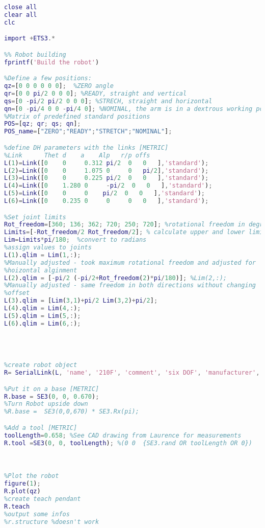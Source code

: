 \begin{lstlisting}[language=Matlab]
%% init
close all
clear all
clc

import +ETS3.* 

%% Robot building
fprintf('Build the robot')

%Define a few positions:
qz=[0 0 0 0 0 0];  %ZERO angle
qr=[0 0 pi/2 0 0 0]; %READY, straight and vertical
qs=[0 -pi/2 pi/2 0 0 0]; %STRECH, straight and horizontal
qn=[0 -pi/4 0 0 -pi/4 0]; %NOMINAL, the arm is in a dextrous working pose
%Matrix of predefined standard positions
POS=[qz; qr; qs; qn];
POS_name=["ZERO";"READY";"STRETCH";"NOMINAL"];

%define DH parameters with the links [METRIC]
%Link      Thet d    a    Alp   r/p offs
L(1)=Link([0    0     0.312 pi/2  0   0   ],'standard');
L(2)=Link([0    0     1.075 0     0   pi/2],'standard'); 
L(3)=Link([0    0     0.225 pi/2  0   0   ],'standard');
L(4)=Link([0    1.280 0     -pi/2  0   0   ],'standard');
L(5)=Link([0    0     0    pi/2  0   0   ],'standard'); 
L(6)=Link([0    0.235 0     0     0   0   ],'standard');

%Set joint limits
Rot_freedom=[360; 136; 362; 720; 250; 720]; %rotational freedom in degrees
Limits=[-Rot_freedom/2 Rot_freedom/2]; % calculate upper and lower limits in degrees
Lim=Limits*pi/180;  %convert to radians
%assign values to joints
L(1).qlim = Lim(1,:);
%Manually adjusted - took maximum rotational freedom and adjusted for
%hoizontal alginment
L(2).qlim = [-pi/2 (-pi/2+Rot_freedom(2)*pi/180)]; %Lim(2,:); 
%Manually adjusted - same freedom in both directions without changing
%offset
L(3).qlim = [Lim(3,1)+pi/2 Lim(3,2)+pi/2];
L(4).qlim = Lim(4,:);
L(5).qlim = Lim(5,:);
L(6).qlim = Lim(6,:);




%create robot object
R= SerialLink(L, 'name', '210F', 'comment', 'six DOF', 'manufacturer', 'FANUC'); %Add base transform if necessary with 'base' and tool transformation with  'tool'

%Put it on a base [METRIC]
R.base = SE3(0, 0, 0.670);
%Turn Robot upside down
%R.base =  SE3(0,0,670) * SE3.Rx(pi);

%Add a tool [METRIC]
toolLength=0.658; %See CAD drawing from Laurence for measurements
R.tool =SE3(0, 0, toolLength); %(0 0  {SE3.rand OR toolLength OR 0})



%Plot the robot
figure(1);
R.plot(qz)
%create teach pendant
R.teach
%output some infos
%r.structure %doesn't work


\end{lstlisting}
